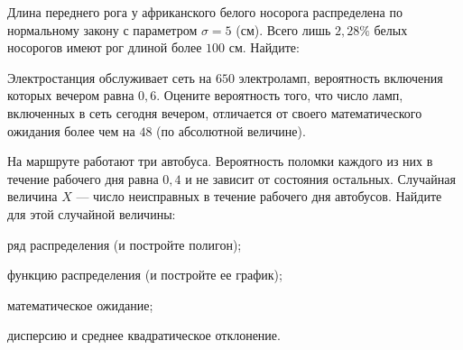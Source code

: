 \vfil

\begin{zkrPlain}{25}\noindent 
	Длина переднего рога у африканского белого носорога распределена по нормальному закону с параметром $\sigma = 5$ (см). Всего лишь $2{,}28\%$ белых носорогов имеют рог длиной более $100$ см. Найдите: \par {}
 
\end{zkrPlain}

\vfil

\begin{zkrPlain}{25}\noindent 
	Электростанция обслуживает сеть на $ 650 $ электроламп, вероятность включения которых вечером равна $ 0{,}6 $. Оцените вероятность того, что число ламп, включенных в сеть сегодня вечером, отличается от своего математического ожидания более чем на $ 48 $ (по абсолютной величине). 
 
\end{zkrPlain}

\newpage\setcounter{zad}{0}\setcounter{footnote}{0}



\begin{zkrPlain}{25}\noindent 
	На маршруте работают три автобуса. Вероятность поломки каждого из них в течение рабочего дня равна $0{,}4$ и не зависит от состояния остальных. Случайная величина $X$ --- число неисправных в течение рабочего дня автобусов.  Найдите для этой случайной величины: \par \smallskip\small{ \par \zz ряд распределения (и постройте полигон); \par \zz функцию распределения (и постройте ее график); \par \zz математическое ожидание; \par \zz дисперсию и среднее квадратическое отклонение.\par \par}
 
\end{zkrPlain}

\vfil

